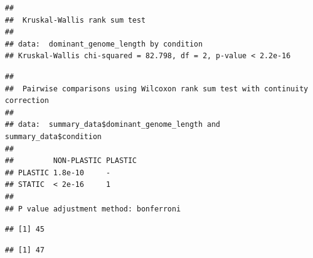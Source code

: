 \documentclass[]{book}
\newenvironment{Shaded}{\begin{snugshade}}{\end{snugshade}}
\newcommand{\DataTypeTok}[1]{\textcolor[rgb]{0.13,0.29,0.53}{#1}}
\newcommand{\KeywordTok}[1]{\textcolor[rgb]{0.13,0.29,0.53}{\textbf{#1}}}
\newcommand{\NormalTok}[1]{#1}
\newcommand{\OperatorTok}[1]{\textcolor[rgb]{0.81,0.36,0.00}{\textbf{#1}}}
\newcommand{\StringTok}[1]{\textcolor[rgb]{0.31,0.60,0.02}{#1}}
\begin{document}
\begin{verbatim}
## 
##  Kruskal-Wallis rank sum test
## 
## data:  dominant_genome_length by condition
## Kruskal-Wallis chi-squared = 82.798, df = 2, p-value < 2.2e-16
\end{verbatim}

\begin{Shaded}
\end{Shaded}

\begin{verbatim}
## 
##  Pairwise comparisons using Wilcoxon rank sum test with continuity correction 
## 
## data:  summary_data$dominant_genome_length and summary_data$condition 
## 
##         NON-PLASTIC PLASTIC
## PLASTIC 1.8e-10     -      
## STATIC  < 2e-16     1      
## 
## P value adjustment method: bonferroni
\end{verbatim}

\begin{Shaded}
\end{Shaded}

\begin{verbatim}
## [1] 45
\end{verbatim}

\begin{Shaded}
\end{Shaded}

\begin{verbatim}
## [1] 47
\end{verbatim}

\begin{Shaded}
\end{Shaded}
\end{document}
